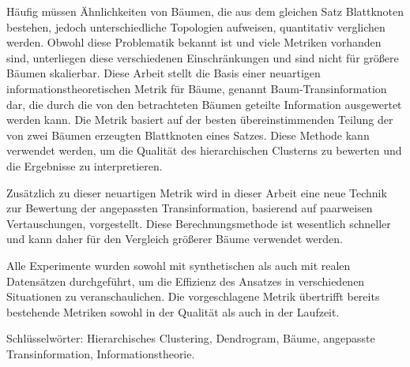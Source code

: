 \small

Häufig müssen Ähnlichkeiten von Bäumen, die aus dem gleichen Satz Blattknoten bestehen, jedoch unterschiedliche Topologien aufweisen, quantitativ verglichen werden. Obwohl diese Problematik bekannt ist und viele Metriken vorhanden sind, unterliegen diese verschiedenen Einschränkungen und sind nicht für größere Bäumen skalierbar. Diese Arbeit stellt die Basis einer neuartigen informationstheoretischen Metrik für Bäume, genannt Baum-Transinformation dar, die durch die von den betrachteten Bäumen geteilte Information ausgewertet werden kann. Die Metrik basiert auf der besten übereinstimmenden Teilung der von zwei Bäumen erzeugten Blattknoten eines Satzes. Diese Methode kann verwendet werden, um die Qualität des hierarchischen Clusterns zu bewerten und die Ergebnisse zu interpretieren.

Zusätzlich zu dieser neuartigen Metrik wird in dieser Arbeit eine neue Technik zur Bewertung der angepassten Transinformation, basierend auf paarweisen Vertauschungen, vorgestellt. Diese Berechnungsmethode ist wesentlich schneller und kann daher für den Vergleich größerer Bäume verwendet werden.

Alle Experimente wurden sowohl mit synthetischen als auch mit realen Datensätzen durchgeführt, um die Effizienz des Ansatzes in verschiedenen Situationen zu veranschaulichen. Die vorgeschlagene Metrik übertrifft bereits bestehende Metriken sowohl in der Qualität als auch in der Laufzeit.

Schlüsselwörter: Hierarchisches Clustering, Dendrogram, Bäume, angepasste Transinformation, Informationstheorie.
